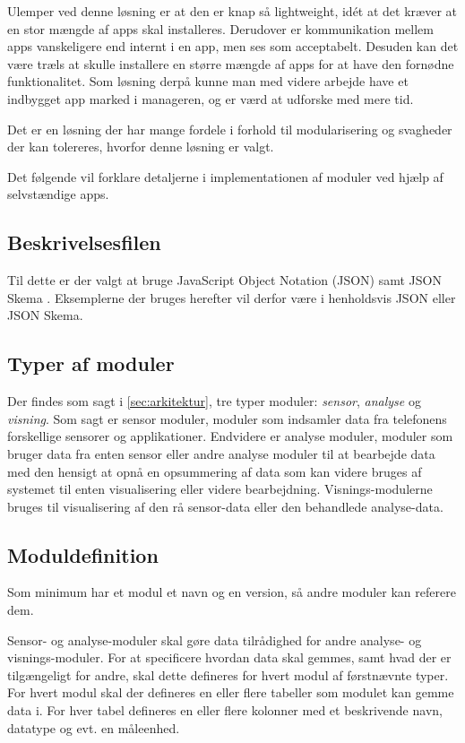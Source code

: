 Ulemper ved denne løsning er at den er knap så lightweight, idét at det kræver at en stor mængde af apps skal installeres.
Derudover er kommunikation mellem apps vanskeligere end internt i en app, men ses som acceptabelt.
Desuden kan det være træls at skulle installere en større mængde af apps for at have den fornødne funktionalitet.
Som løsning derpå kunne man med videre arbejde have et indbygget app marked i manageren, og er værd at udforske med mere tid.

Det er en løsning der har mange fordele i forhold til modularisering og svagheder der kan tolereres, hvorfor denne løsning er valgt. 

Det følgende vil forklare detaljerne i implementationen af moduler ved hjælp af selvstændige apps.

\subsection{Beskrivelsesfilen}

Til dette er der valgt at bruge JavaScript Object Notation (JSON) samt JSON Skema \cite{json_schema}.
Eksemplerne der bruges herefter vil derfor være i henholdsvis JSON eller JSON Skema.

\subsection{Typer af moduler}
Der findes som sagt i \cref{sec:arkitektur}, tre typer moduler: \textit{sensor}, \textit{analyse} og \textit{visning}.
Som sagt er sensor moduler, moduler som indsamler data fra telefonens forskellige sensorer og applikationer.
Endvidere er analyse moduler, moduler som bruger data fra enten sensor eller andre analyse moduler til at bearbejde data med den hensigt at opnå en opsummering af data som kan videre bruges af systemet til enten visualisering eller videre bearbejdning.
Visnings-modulerne bruges til visualisering af den rå sensor-data eller den behandlede analyse-data.

\subsection{Moduldefinition}
Som minimum har et modul et navn og en version, så andre moduler kan referere dem.

Sensor- og analyse-moduler skal gøre data tilrådighed for andre analyse- og visnings-moduler.
For at specificere hvordan data skal gemmes, samt hvad der er tilgængeligt for andre, skal dette defineres for hvert modul af førstnævnte typer.
For hvert modul skal der defineres en eller flere tabeller som modulet kan gemme data i.
For hver tabel defineres en eller flere kolonner med et beskrivende navn, datatype og evt. en måleenhed.

